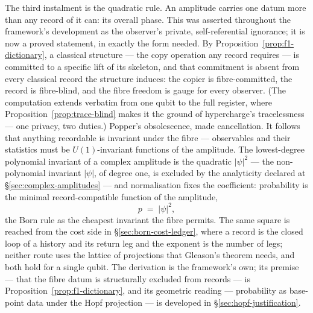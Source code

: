 The third instalment is the quadratic rule. An amplitude carries one datum more than any record of
it can: its overall phase. This was asserted throughout the framework's development as the
observer's private, self-referential ignorance; it is now a proved statement, in exactly the form
needed. By Proposition~\ref{prop:f1-dictionary}, a classical structure --- the copy operation any
record requires --- is committed to a specific lift of its skeleton, and that commitment is absent
from every classical record the structure induces: the copier is fibre-committed, the record is
fibre-blind, and the fibre freedom is gauge for every observer. (The computation extends verbatim
from one qubit to the full register, where Proposition~\ref{prop:trace-blind} makes it the ground
of hypercharge's tracelessness --- one privacy, two duties.) Popper's obsolescence, made
cancellation. It follows that anything recordable is invariant under the fibre --- observables and
their statistics must be $U(1)$-invariant functions of the amplitude. The lowest-degree polynomial invariant
of a complex amplitude is the quadratic $|\psi|^{2}$ --- the non-polynomial invariant $|\psi|$,
of degree one, is excluded by the analyticity declared at \S\ref{sec:complex-amplitudes} --- and
normalisation fixes the coefficient:
probability is the minimal record-compatible function of the amplitude,
\[
p \;=\; |\psi|^{2},
\]
the Born rule as the cheapest invariant the fibre permits. The same square is reached from the
cost side in \S\ref{sec:born-cost-ledger}, where a record is the closed loop of a history and its
return leg and the exponent is the number of legs; neither route uses the lattice of projections
that Gleason's theorem needs, and both hold for a single qubit. The derivation is the framework's
own;
its premise --- that the fibre datum is structurally excluded from records --- is
Proposition~\ref{prop:f1-dictionary}, and its geometric reading --- probability as base-point data
under the Hopf projection --- is developed in \S\ref{sec:hopf-justification}.

